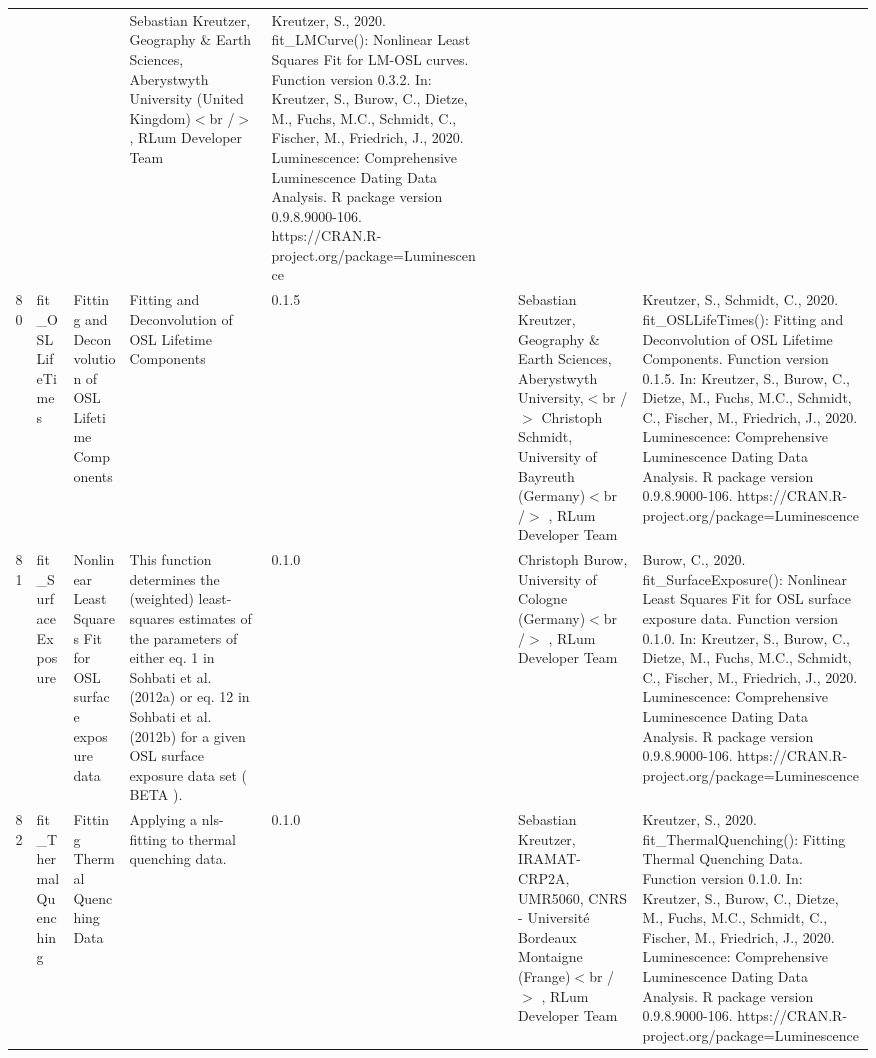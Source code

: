 \begin{table}[ht]
\begin{tabular}{rllllllll}
 &  &  & Sebastian Kreutzer, Geography \& Earth Sciences, Aberystwyth University (United Kingdom)$<$br /$>$ , RLum Developer Team & Kreutzer, S., 2020. fit\_LMCurve(): Nonlinear Least Squares Fit for LM-OSL curves. Function version 0.3.2. In: Kreutzer, S., Burow, C., Dietze, M., Fuchs, M.C., Schmidt, C., Fischer, M., Friedrich, J., 2020. Luminescence: Comprehensive Luminescence Dating Data Analysis. R package version 0.9.8.9000-106. https://CRAN.R-project.org/package=Luminescence
 \\ 
  80 & fit\_OSLLifeTimes & Fitting and Deconvolution of OSL Lifetime Components & Fitting and Deconvolution of OSL Lifetime Components & 0.1.5
 &  &  & Sebastian Kreutzer, Geography \& Earth Sciences, Aberystwyth University,$<$br /$>$ Christoph Schmidt, University of Bayreuth (Germany)$<$br /$>$ , RLum Developer Team & Kreutzer, S., Schmidt, C., 2020. fit\_OSLLifeTimes(): Fitting and Deconvolution of OSL Lifetime Components. Function version 0.1.5. In: Kreutzer, S., Burow, C., Dietze, M., Fuchs, M.C., Schmidt, C., Fischer, M., Friedrich, J., 2020. Luminescence: Comprehensive Luminescence Dating Data Analysis. R package version 0.9.8.9000-106. https://CRAN.R-project.org/package=Luminescence
 \\ 
  81 & fit\_SurfaceExposure & Nonlinear Least Squares Fit for OSL surface exposure data & This function determines the (weighted) least-squares estimates of the parameters of either eq. 1 in  Sohbati et al. (2012a)  or eq. 12 in Sohbati et al. (2012b)  for a given OSL surface exposure data set ( BETA ). & 0.1.0
 &  &  & Christoph Burow, University of Cologne (Germany)$<$br /$>$ , RLum Developer Team & Burow, C., 2020. fit\_SurfaceExposure(): Nonlinear Least Squares Fit for OSL surface exposure data. Function version 0.1.0. In: Kreutzer, S., Burow, C., Dietze, M., Fuchs, M.C., Schmidt, C., Fischer, M., Friedrich, J., 2020. Luminescence: Comprehensive Luminescence Dating Data Analysis. R package version 0.9.8.9000-106. https://CRAN.R-project.org/package=Luminescence
 \\ 
  82 & fit\_ThermalQuenching & Fitting Thermal Quenching Data & Applying a nls-fitting to thermal quenching data. & 0.1.0
 &  &  & Sebastian Kreutzer, IRAMAT-CRP2A, UMR5060, CNRS - Université Bordeaux Montaigne (Frange)$<$br /$>$ , RLum Developer Team & Kreutzer, S., 2020. fit\_ThermalQuenching(): Fitting Thermal Quenching Data. Function version 0.1.0. In: Kreutzer, S., Burow, C., Dietze, M., Fuchs, M.C., Schmidt, C., Fischer, M., Friedrich, J., 2020. Luminescence: Comprehensive Luminescence Dating Data Analysis. R package version 0.9.8.9000-106. https://CRAN.R-project.org/package=Luminescence

\end{tabular}
\end{table}
